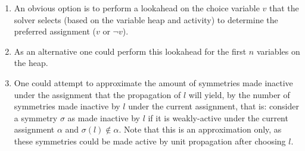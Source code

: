 	\begin{enumerate}
		\item An obvious option is to perform a lookahead on the choice variable $v$ that the solver
			selects (based on the variable heap and activity) to determine the
			preferred assignment ($v$ or $\neg v$).

		\item As an alternative one could perform this lookahead for the first $n$ variables on the
			heap.

		\item One could attempt to approximate the amount of symmetries made inactive under the
			assignment that the propagation of $l$ will yield, by the number of symmetries made
			inactive by $l$ under the current assignment, that is: consider a symmetry $\sigma$ as
			made inactive by $l$ if it is weakly-active under the current assignment $\alpha$ and
			$\sigma(l) \notin \alpha$.
			Note that this is an approximation only, as these symmetries could be made active by
			unit propagation after choosing $l$.

	\end{enumerate}
